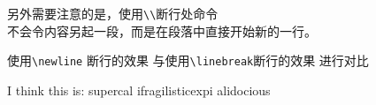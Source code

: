 \documentclass{ctexart}
\begin{document}
另外需要注意的是，使用\verb|\\|断行处命令\\
不会令内容另起一段，而是在段落中直接开始新的一行。



使用\verb|\newline| 断行的效果
\newline
与使用\verb|\linebreak|断行的效果
\linebreak
进行对比

I think this is: su\-per\-cal\-%
i\-frag\-i\-lis\-tic\-ex\-pi\-%
al\-i\-do\-cious
\end{document}
